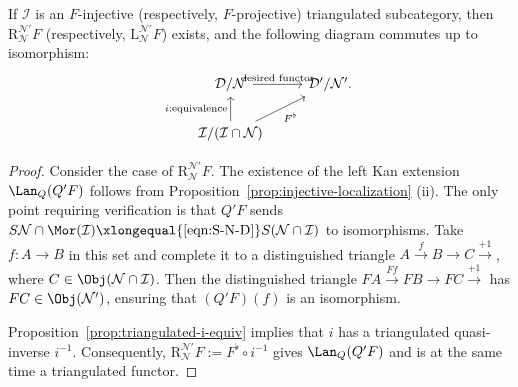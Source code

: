 \begin{proposition}\label{prop:localization-injective}
	If $\mathcal{I}$ is an $F$-injective (respectively, $F$-projective)
	triangulated subcategory, then
	$\mathrm{R}^{\mathcal{N}'}_{\mathcal{N}}F$ (respectively,
	$\mathrm{L}^{\mathcal{N}'}_{\mathcal{N}}F$) exists, and the following
	diagram commutes up to isomorphism:
	\[\begin{tikzcd}
		\mathcal{D}/\mathcal{N} \arrow[r, "\text{desired functor}"] & \mathcal{D}'/\mathcal{N}' . \\
		\mathcal{I}/(\mathcal{I} \cap \mathcal{N}) \arrow[u, "{i: \text{equivalence}}"] \arrow[ru, "{F^\flat}"'] &
	\end{tikzcd}\]
\end{proposition}
\begin{proof}
	Consider the case of $\mathrm{R}^{\mathcal{N}'}_{\mathcal{N}}F$. The
	existence of the left Kan extension $\Lan_Q(Q'F)$ follows from
	Proposition~\ref{prop:injective-localization} (ii). The only point requiring
	verification is that $Q'F$ sends
	$S\mathcal{N}\cap\Mor(\mathcal{I})
	\xlongequal{\eqref{eqn:S-N-D}}S(\mathcal{N}\cap\mathcal{I})$ to
	isomorphisms. Take $f:A\to B$ in this set and complete it to a distinguished
	triangle $A\xrightarrow{f}B\to C\xrightarrow{+1}$, where
	$C\in\Obj(\mathcal{N}\cap\mathcal{I})$. Then the distinguished triangle
	$FA\xrightarrow{Ff}FB\to FC\xrightarrow{+1}$ has
	$FC\in\Obj(\mathcal{N}')$, ensuring that $(Q'F)(f)$ is an isomorphism.

	Proposition~\ref{prop:triangulated-i-equiv} implies that $i$ has a
	triangulated quasi-inverse $i^{-1}$. Consequently,
	$\mathrm{R}^{\mathcal{N}'}_{\mathcal{N}}F:=F^\flat\circ i^{-1}$ gives
	$\Lan_Q(Q'F)$ and is at the same time a triangulated functor.
\end{proof}


